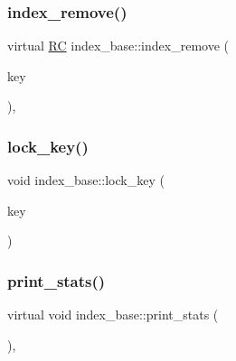 \mbox{\label{classindex__base_a9af0a86bbc85f29fa12d1394317b6fbd}} 
\subsubsection{\texorpdfstring{index\+\_\+remove()}{index\_remove()}}
{\footnotesize\ttfamily virtual \hyperlink{global_8h_a78c49a674c810fdd03d20432f7be864a}{RC} index\+\_\+base\+::index\+\_\+remove (\begin{DoxyParamCaption}\item[{\hyperlink{index__base_8h_ae35c40bc2f912c11f0e36ac66cba4489}{K\+E\+Y\+\_\+\+T\+Y\+PE}}]{key }\end{DoxyParamCaption})\hspace{0.3cm}{\ttfamily [inline]}, {\ttfamily [virtual]}}

\mbox{\label{classindex__base_aa1e0da4c7da2fc75201d567a007cf746}} 
\subsubsection{\texorpdfstring{lock\+\_\+key()}{lock\_key()}}
{\footnotesize\ttfamily void index\+\_\+base\+::lock\+\_\+key (\begin{DoxyParamCaption}\item[{\hyperlink{index__base_8h_ae35c40bc2f912c11f0e36ac66cba4489}{K\+E\+Y\+\_\+\+T\+Y\+PE}}]{key }\end{DoxyParamCaption})\hspace{0.3cm}{\ttfamily [inline]}}

\mbox{\label{classindex__base_a2515fc45e7ca43a9914c0410a9b663c8}} 
\subsubsection{\texorpdfstring{print\+\_\+stats()}{print\_stats()}}
{\footnotesize\ttfamily virtual void index\+\_\+base\+::print\+\_\+stats (\begin{DoxyParamCaption}{ }\end{DoxyParamCaption})\hspace{0.3cm}{\ttfamily [inline]}, {\ttfamily [virtual]}}



